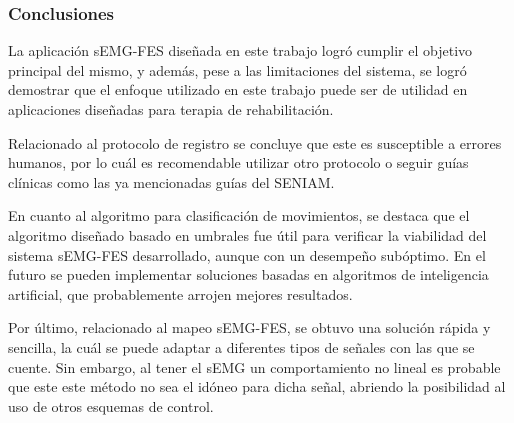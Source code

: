 \subsubsection*{Conclusiones}
La aplicación sEMG-FES diseñada en este trabajo logró cumplir el objetivo principal del mismo, y además, pese a las limitaciones del sistema, se logró demostrar que el enfoque utilizado en este trabajo puede ser de utilidad en aplicaciones diseñadas para terapia de rehabilitación.

Relacionado al protocolo de registro se concluye que este es susceptible a errores humanos, por lo cuál es recomendable utilizar otro protocolo o seguir guías clínicas como las ya mencionadas guías del SENIAM.

En cuanto al algoritmo para clasificación de movimientos, se destaca que el algoritmo diseñado basado en umbrales fue útil para verificar la viabilidad del sistema sEMG-FES desarrollado, aunque con un desempeño subóptimo. En el futuro se pueden implementar soluciones basadas en algoritmos de inteligencia artificial, que probablemente arrojen mejores resultados.

Por último, relacionado al mapeo sEMG-FES, se obtuvo una solución rápida y sencilla, la cuál se puede adaptar a diferentes tipos de señales con las que se cuente. Sin embargo, al tener el sEMG un comportamiento no lineal es probable que este este método no sea el idóneo para dicha señal, abriendo la posibilidad al uso de otros esquemas de control.
